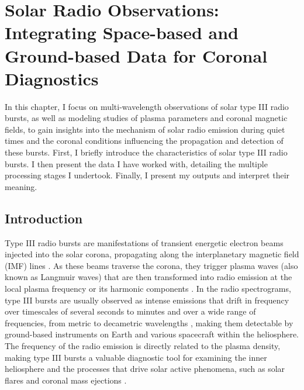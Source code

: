 \chapter{Solar Radio Observations: Integrating Space-based and Ground-based Data for Coronal Diagnostics}
\label{chapter3}
In this chapter, I focus on multi-wavelength observations of solar type III radio bursts, as well as modeling studies of plasma parameters and coronal magnetic fields, to gain insights into the mechanism of solar radio emission during quiet times and the coronal conditions influencing the propagation and detection of these bursts. First, I briefly introduce the characteristics of solar type III radio bursts. I then present the data I have worked with, detailing the multiple processing stages I undertook. Finally, I present my outputs and interpret their meaning.

\section{Introduction}
Type III radio bursts are manifestations of transient energetic electron beams injected into the solar corona, propagating along the interplanetary magnetic field (IMF) lines \cite{ergun_1998, pick_radio_2006, reid_2020}. As these beams traverse the corona, they trigger plasma waves (also known as Langmuir waves) that are then transformed into radio emission at the local plasma frequency or its harmonic components \cite{melrose_2017}.
In the radio spectrograms, type III bursts are usually observed as intense emissions that drift in frequency over timescales of several seconds to minutes and over a wide range of frequencies, from metric to decametric wavelengths \cite{wild_1950a, lecacheux_1989, bonnin_2008}, making them detectable by ground-based instruments on Earth and various spacecraft within the heliosphere. 
The frequency of the radio emission is directly related to the plasma density, making type III bursts a valuable diagnostic tool for examining the inner heliosphere and the processes that drive solar active phenomena, such as solar flares and coronal mass ejections \cite{reid_2014, kontar_2017}.

